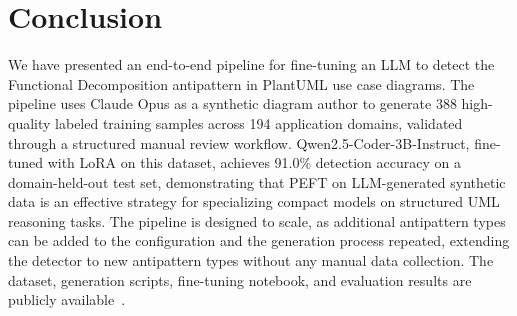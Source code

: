 \documentclass[sigconf,review,anonymous]{acmart}
\begin{document}
\section{Conclusion}
\label{sec:conclusion}

We have presented an end-to-end pipeline for fine-tuning an LLM
to detect the Functional Decomposition antipattern in PlantUML use case
diagrams.  The pipeline uses Claude Opus as a synthetic diagram author to
generate 388 high-quality labeled training samples across 194 application
domains, validated through a structured manual review workflow.
Qwen2.5-Coder-3B-Instruct, fine-tuned with LoRA on this dataset, achieves
91.0\% detection accuracy on a domain-held-out test set, demonstrating that
PEFT on LLM-generated synthetic data is an
effective strategy for specializing compact models on structured UML
reasoning tasks.  The pipeline is designed to scale, as additional antipattern
types can be added to the configuration and the generation process repeated,
extending the detector to new antipattern types without any manual data collection.
The dataset, generation scripts, fine-tuning notebook, and evaluation results are
publicly available~\cite{khan2026repo}.



\end{document}
